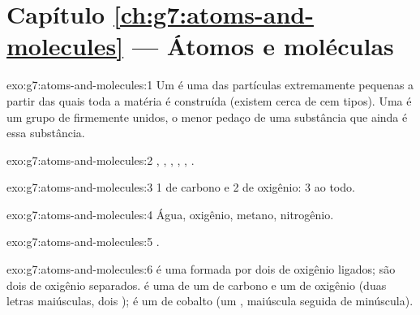 \section*{Capítulo \ref{ch:g7:atoms-and-molecules} --- Átomos e moléculas}

\begin{solution}{exo:g7:atoms-and-molecules:1}
Um  é uma das partículas extremamente pequenas a partir das quais
toda a matéria é construída (existem cerca de cem tipos). Uma  é
um grupo de  firmemente unidos, o menor pedaço de uma substância
que ainda é essa substância.
\end{solution}

\begin{solution}{exo:g7:atoms-and-molecules:2}
, , , , , .
\end{solution}

\begin{solution}{exo:g7:atoms-and-molecules:3}
1  de carbono e 2  de oxigênio: 3  ao todo.
\end{solution}

\begin{solution}{exo:g7:atoms-and-molecules:4}
Água, oxigênio, metano, nitrogênio.
\end{solution}

\begin{solution}{exo:g7:atoms-and-molecules:5}
.
\end{solution}

\begin{solution}{exo:g7:atoms-and-molecules:6}
 é uma  formada por dois  de oxigênio ligados;
 são dois  de oxigênio separados.  é uma  de
um  de carbono e um de oxigênio (duas letras maiúsculas, dois
);  é um  de cobalto (um , maiúscula seguida
de minúscula).
\end{solution}


